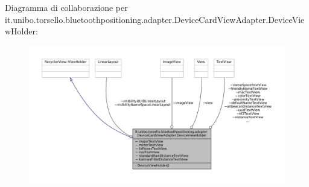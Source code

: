 Diagramma di collaborazione per it.\+unibo.\+torsello.\+bluetoothpositioning.\+adapter.\+Device\+Card\+View\+Adapter.\+Device\+View\+Holder\+:
\nopagebreak
\begin{figure}[H]
\begin{center}
\leavevmode
\includegraphics[width=350pt]{classit_1_1unibo_1_1torsello_1_1bluetoothpositioning_1_1adapter_1_1DeviceCardViewAdapter_1_1DeviceViewHolder__coll__graph}
\end{center}
\end{figure}

